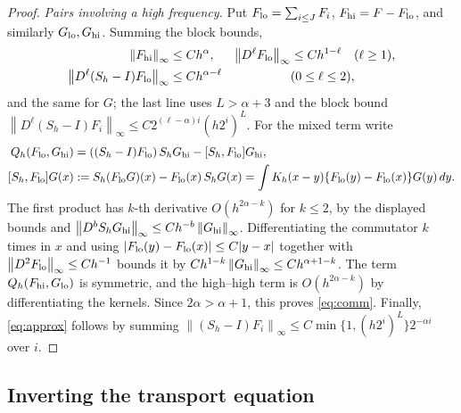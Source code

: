 \documentclass[12pt]{article}
\numberwithin{equation}{section}
\newcommand{\norm}[1]{\left\|#1\right\|}
\begin{document}
\begin{proof}
\emph{Pairs involving a high frequency.} Put
$F_{\rm lo}=\sum_{i\le J}F_i$, $F_{\rm hi}=F-F_{\rm lo}$, and similarly
$G_{\rm lo},G_{\rm hi}$. Summing the block bounds,
\[
 \begin{aligned}
 \norm{F_{\rm hi}}_\infty&\le Ch^\alpha,&
 \norm{D^\ell F_{\rm lo}}_\infty&\le Ch^{1-\ell}\quad(\ell\ge1),\\
 \norm{D^\ell(S_h-I)F_{\rm lo}}_\infty&\le Ch^{\alpha-\ell}
                  &&(0\le\ell\le2),
 \end{aligned}
\]
and the same for $G$; the last line uses $L>\alpha+3$ and the block
bound $\norm{D^\ell(S_h-I)F_i}_\infty\le C2^{(\ell-\alpha)i}(h2^i)^L$.
For the mixed term write
\begin{align*}
 Q_h(F_{\rm lo},G_{\rm hi})
 &=((S_h-I)F_{\rm lo})\,S_hG_{\rm hi}-[S_h,F_{\rm lo}]G_{\rm hi},\\
 [S_h,F_{\rm lo}]G(x)&:=S_h(F_{\rm lo}G)(x)-F_{\rm lo}(x)\,S_hG(x)
 =\int K_h(x-y)\{F_{\rm lo}(y)-F_{\rm lo}(x)\}G(y)\,dy .
\end{align*}
The first product has $k$-th derivative $O(h^{2\alpha-k})$ for
$k\le2$, by the displayed bounds and
$\norm{D^bS_hG_{\rm hi}}_\infty\le Ch^{-b}\norm{G_{\rm hi}}_\infty$.
Differentiating the commutator $k$ times in $x$ and using
$|F_{\rm lo}(y)-F_{\rm lo}(x)|\le C|y-x|$ together with
$\norm{D^2F_{\rm lo}}_\infty\le Ch^{-1}$ bounds it by
$Ch^{1-k}\norm{G_{\rm hi}}_\infty\le Ch^{\alpha+1-k}$. The term
$Q_h(F_{\rm hi},G_{\rm lo})$ is symmetric, and the high--high term is
$O(h^{2\alpha-k})$ by differentiating the kernels. Since $2\alpha>\alpha+1$, this proves
\eqref{eq:comm}. Finally, \eqref{eq:approx} follows by summing
$\norm{(S_h-I)F_i}_\infty\le C\min\{1,(h2^i)^L\}2^{-\alpha i}$ over $i$.
\end{proof}

\subsection{Inverting the transport equation}\label{sec:transport}
\end{document}
